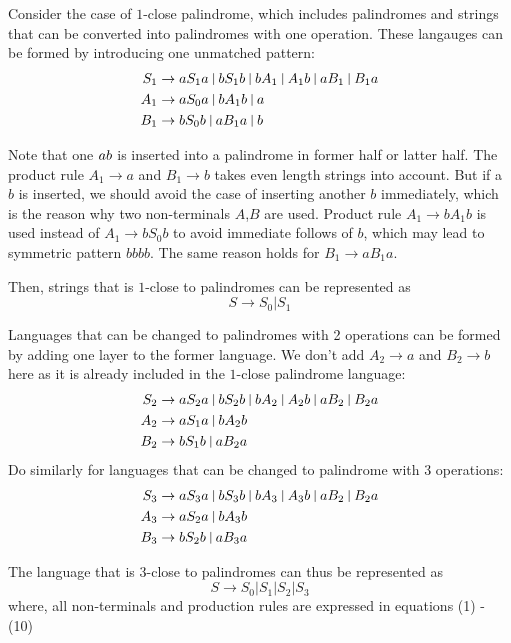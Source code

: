 \documentclass[12pt,a4paper]{article}
\begin{document}
Consider the case of $1$-close palindrome, which includes palindromes and strings that can be converted into palindromes with one operation. These langauges can be formed by introducing one unmatched pattern:
\begin{align}
  S_1 & \rightarrow aS_1a\ \vline\ bS_1b\ \vline\ bA_1\ \vline\ A_1b\  \vline\ aB_1\ \vline\ B_1a \\
  A_1 &\rightarrow aS_0a\ \vline\ bA_1b\ \vline\ a \\
  B_1 &\rightarrow bS_0b\ \vline\ aB_1a\ \vline\ b
\end{align}

Note that one $a\/b$ is inserted into a palindrome in former half or latter half. The product rule $A_1 \rightarrow a$ and $B_1 \rightarrow b$ takes even length strings into account. But if a $b$ is inserted, we should avoid the case of inserting another $b$ immediately, which is the reason why two non-terminals $A$,$B$ are used. Product rule $A_1 \rightarrow bA_1b$ is used instead of $A_1 \rightarrow bS_0b$ to avoid immediate follows of $b$, which may lead to symmetric pattern $bbbb$. The same reason holds for $B_1 \rightarrow aB_1a$.

Then, strings that is $1$-close to palindromes can be represented as  
$$
  S \rightarrow S_0 | S_1
$$

Languages that can be changed to palindromes with 2 operations can be formed by adding one layer to the former language. We don't add $A_2\rightarrow a$ and $B_2\rightarrow b$ here as it is already included in the $1$-close palindrome language:
\begin{align}
  S_2 & \rightarrow aS_2a\ \vline\ bS_2b\ \vline\ bA_2\ \vline\ A_2b\  \vline\ aB_2\ \vline\ B_2a \\
  A_2 &\rightarrow aS_1a\ \vline\ bA_2b \\
  B_2 &\rightarrow bS_1b\ \vline\ aB_2a
\end{align}
Do similarly for languages that can be changed to palindrome with 3 operations:
\begin{align}
  S_3 & \rightarrow aS_3a\ \vline\ bS_3b\ \vline\ bA_3\ \vline\ A_3b\  \vline\ aB_2\ \vline\ B_2a \\
  A_3 &\rightarrow aS_2a\ \vline\ bA_3b \\
  B_3 &\rightarrow bS_2b\ \vline\ aB_3a
\end{align}

The language that is 3-close to palindromes can thus be represented as
$$
  S \rightarrow S_0 | S_1 | S_2 | S_3
$$
where, all non-terminals and production rules are expressed in equations (1) - (10)
\end{document}
